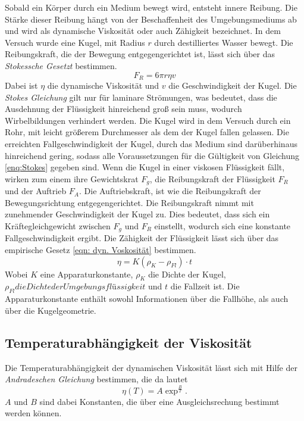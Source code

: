 Sobald ein Körper durch ein Medium bewegt wird, entsteht innere Reibung. Die Stärke dieser Reibung hängt von der Beschaffenheit
des Umgebungsmediums ab und wird als dynamische Viskosität oder auch Zähigkeit bezeichnet.
In dem Versuch wurde eine Kugel, mit Radius $r$ durch destilliertes Wasser bewegt. Die Reibungskraft, die der Bewegung
entgegengerichtet ist, lässt sich über das \emph{Stokessche Gesetzt} bestimmen.
\begin{equation}
  \label{eqn:Stokes}
  F_R = 6\pi r \eta v
\end{equation}
Dabei ist $\eta$ die dynamische Viskosität und $v$ die Geschwindigkeit der Kugel. Die \emph{Stokes Gleichung} gilt nur für laminare
Strömungen, was bedeutet, dass die Ausdehnung der Flüssigkeit hinreichend groß sein muss, wodurch Wirbelbildungen verhindert werden.
Die Kugel wird in dem Versuch durch ein Rohr, mit leicht größerem Durchmesser als dem der Kugel fallen gelassen.
Die erreichten Fallgeschwindigkeit der Kugel, durch das Medium sind darüberhinaus hinreichend gering, sodass
alle Voraussetzungen für die Gültigkeit von Gleichung \eqref{enq:Stokes} gegeben sind.
Wenn die Kugel in einer viskosen Flüssigkeit fällt, wirken zum einem ihre Gewichtskrat $F_g$, die Reibungskraft der Flüssigkeit $F_R$
und der Auftrieb $F_A$. Die Auftriebskraft, ist wie die Reibungskraft der Bewegungsrichtung entgegengerichtet.
Die Reibungskraft nimmt mit zunehmender Geschwindigkeit der Kugel zu. Dies bedeutet, dass sich ein Kräftegleichgewicht zwischen
$F_g$ und $F_R$ einstellt, wodurch sich eine konstante Fallgeschwindigkeit ergibt.
Die Zähigkeit der Flüssigkeit lässt sich über das empirische Gesetz \eqref{eqn: dyn. Voskosität} bestimmen.
\begin{equation}
  \label{eqn: dyn. Viskosität}
  \eta = K(\rho_K - \rho_{Fl}) \cdot t
\end{equation}
Wobei $K$ eine Apparaturkonstante, $\rho_K$ die Dichte der Kugel, $\rho_{Fl} die Dichte der Umgebungsflüssigkeit$ und $t$ die Fallzeit ist.
Die Apparaturkonstante enthält sowohl Informationen über die Fallhöhe, als auch über die Kugelgeometrie.

\subsection{Temperaturabhängigkeit der Viskosität}

Die Temperaturabhängigkeit der dynamischen Viskosität lässt sich mit Hilfe der \emph{Andradeschen Gleichung} bestimmen, die da lautet
\begin{equation}
  \eta(T) = A \exp^{\frac{B}{T}}.
\end{equation}
$A$ und $B$ sind dabei Konstanten, die über eine Ausgleichsrechung bestimmt werden können.

